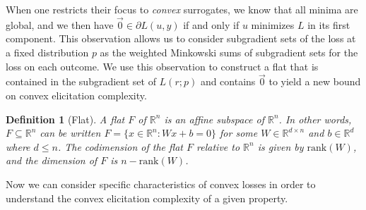 \documentclass{article}
\newcommand{\reals}{\mathbb{R}}
\newtheorem{definition}{Definition}
\begin{document}
When one restricts their focus to \emph{convex} surrogates, we know that all minima are global, and we then have $\vec 0  \in \partial L(u, y)$ if and only if $u$ minimizes $L$ in its first component.
This observation allows us to consider subgradient sets of the loss at a fixed distribution $p$ as the weighted Minkowski sums of subgradient sets for the loss on each outcome.
We use this observation to construct a flat that is contained in the subgradient set of $L(r;p)$ and contains $\vec 0$ to yield a new bound on convex elicitation complexity.

\begin{definition}[Flat]
	A \emph{flat} $F$ of $\reals^n$ is an affine subspace of $\reals^n$.
	In other words, $F\subseteq \reals^n$ can be written $F=\{x\in\reals^n : Wx + b = 0\}$ for some $W\in\reals^{d\times n}$ and $b\in\reals^d$ where $d\leq n$.
	The codimension of the flat $F$ relative to $\reals^n$ is given by $\mathrm{rank}(W)$, and the dimension of $F$ is $n - \mathrm{rank}(W)$.
\end{definition}

Now we can consider specific characteristics of convex losses in order to understand the convex elicitation complexity of a given property.
\end{document}
